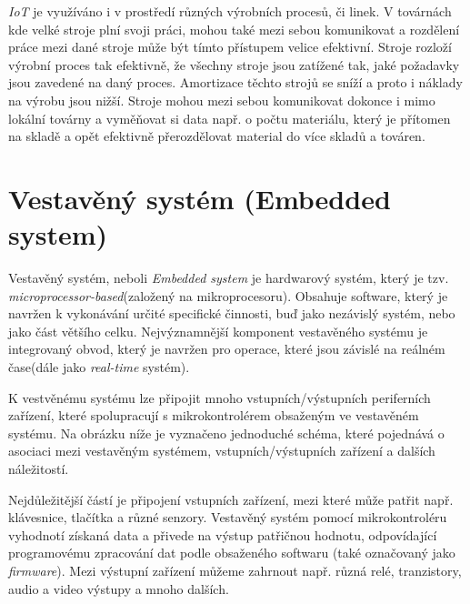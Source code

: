 \emph{IoT} je využíváno i v prostředí různých výrobních procesů, či linek. V továrnách kde velké stroje plní svoji práci, mohou také mezi sebou komunikovat a rozdělení práce mezi dané stroje může být tímto přístupem velice efektivní.
Stroje rozloží výrobní proces tak efektivně, že všechny stroje jsou zatížené tak, jaké požadavky jsou zavedené na daný proces. Amortizace těchto strojů se sníží a proto i náklady na výrobu jsou nižší. Stroje mohou mezi sebou komunikovat dokonce
i mimo lokální továrny a vyměňovat si data např. o počtu materiálu, který je přítomen na skladě a opět efektivně přerozdělovat material do více skladů a továren.

\newpage

\section{Vestavěný systém (Embedded system)}
\label{terminy:vestaveny}

Vestavěný systém, neboli \emph{Embedded system} je hardwarový systém, který je tzv. \emph{microprocessor-based}(založený na mikroprocesoru).
Obsahuje software, který je navržen k vykonávání určité specifické činnosti, buď jako nezávislý systém, nebo jako část většího celku.
Nejvýznamnější komponent vestavěného systému je integrovaný obvod, který je navržen pro operace, které jsou závislé na reálném čase(dále jako \emph{real-time} systém).~\cite{embedded:info}

K vestvěnému systému lze připojit mnoho vstupních/výstupních periferních zařízení, které spolupracují s mikrokontrolérem obsaženým ve vestavěném systému.
Na obrázku níže je vyznačeno jednoduché schéma, které pojednává o asociaci mezi vestavěným systémem, vstupních/výstupních zařízení a dalších náležitostí.

Nejdůležitější částí je připojení vstupních zařízení, mezi které může patřit např. klávesnice, tlačítka a různé senzory. Vestavěný systém pomocí mikrokontroléru vyhodnotí získaná data
a přivede na výstup patřičnou hodnotu, odpovídající programovému zpracování dat podle obsaženého softwaru (také označovaný jako \emph{firmware}). Mezi výstupní zařízení můžeme zahrnout např. různá relé, tranzistory, audio a video výstupy a mnoho dalších.

